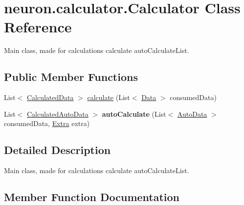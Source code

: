 \hypertarget{classneuron_1_1calculator_1_1Calculator}{}\section{neuron.\+calculator.\+Calculator Class Reference}
\label{classneuron_1_1calculator_1_1Calculator}


Main class, made for calculations  calculate  auto\+Calculate\+List.  


\subsection*{Public Member Functions}
\begin{DoxyCompactItemize}
\item 
List$<$ \hyperlink{classneuron_1_1entities_1_1CalculatedData}{Calculated\+Data} $>$ \hyperlink{classneuron_1_1calculator_1_1Calculator_af2169a8fa98450acbf4bd295a6328f78}{calculate} (List$<$ \hyperlink{classneuron_1_1entities_1_1Data}{Data} $>$ consumed\+Data)
\item 
\mbox{\label{classneuron_1_1calculator_1_1Calculator_a354af01c365c0d074c70205e032dbfd3}} 
List$<$ \hyperlink{classneuron_1_1entities_1_1CalculatedAutoData}{Calculated\+Auto\+Data} $>$ {\bfseries auto\+Calculate} (List$<$ \hyperlink{classneuron_1_1entities_1_1AutoData}{Auto\+Data} $>$ consumed\+Data, \hyperlink{classneuron_1_1entities_1_1Extra}{Extra} extra)
\end{DoxyCompactItemize}


\subsection{Detailed Description}
Main class, made for calculations  calculate  auto\+Calculate\+List. 

\subsection{Member Function Documentation}
\mbox{\label{classneuron_1_1calculator_1_1Calculator_af2169a8fa98450acbf4bd295a6328f78}} 
